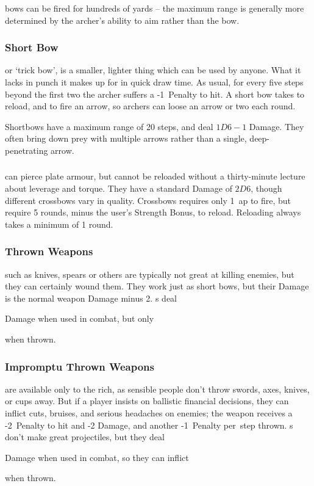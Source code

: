 \begin{multicols}{2}
\Glspl{bow} can be fired for hundreds of yards -- the maximum range is generally more determined by the archer's ability to aim rather than the bow.

\subsubsection{Short Bow}
or `trick bow', is a smaller, lighter thing which can be used by anyone.
What it lacks in punch it makes up for in quick draw time.
As usual, for every five steps beyond the first two the archer suffers a -1~Penalty to hit.
A short bow takes  to reload, and  to fire an arrow, so archers can loose an arrow or two each round.

Shortbows have a maximum range of 20 steps, and deal $1D6-1$ Damage.
They often bring down prey with multiple arrows rather than a single, deep-penetrating arrow.

\subsubsection{}
\label{crossbow}
can pierce plate armour, but cannot be reloaded without a thirty-minute lecture about leverage and torque.
They have a standard Damage of $2D6$, though different crossbows vary in quality.
Crossbows requires only 1~\gls{ap} to fire, but require 5 \glspl{round}, minus the user's Strength Bonus, to reload.
Reloading always takes a minimum of 1 \gls{round}.

\subsubsection{Thrown Weapons}
such as knives, spears or others are typically not great at killing enemies, but they can certainly wound them.
They work just as short bows, but their Damage is the normal weapon Damage minus 2.
\javelin\weaponName s deal
\addtocounter{weaponDamage}{4}
 Damage
when used in combat, but only
\addtocounter{weaponDamage}{-2}%
 when thrown.

\subsubsection{Impromptu Thrown Weapons}
are available only to the rich, as sensible people don't throw swords, axes, knives, or cups away.
But if a player insists on ballistic financial decisions, they can inflict cuts, bruises, and serious headaches on enemies; the weapon receives a -2~Penalty to hit and -2 Damage, and another -1~Penalty per~\gls{step} thrown.
\longsword\weaponName s don't make great projectiles, but they deal
\addtocounter{weaponDamage}{4}
 Damage
when used in combat, so they can inflict
\addtocounter{weaponDamage}{-2}%
 when thrown.

\end{multicols}

